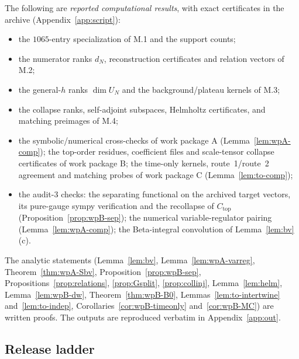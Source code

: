 \documentclass{article}
\theoremstyle{remark}
\begin{document}
The following are \emph{reported computational results}, with exact certificates in the archive (Appendix~\ref{app:script}):
\begin{itemize}
\item the $1065$-entry specialization of M.1 and the support counts;
\item the numerator ranks $d_N$, reconstruction certificates and relation vectors of M.2;
\item the general-$h$ ranks $\dim U_N$ and the background/plateau kernels of M.3;
\item the collapse ranks, self-adjoint subspaces, Helmholtz certificates, and matching preimages of M.4;
\item the symbolic/numerical cross-checks of work package A (Lemma~\ref{lem:wpA-comp}); the top-order residues, coefficient files and scale-tensor collapse certificates of work package B; the time-only kernels, route~1/route~2 agreement and matching probes of work package C (Lemma~\ref{lem:to-comp});
\item the audit-3 checks: the separating functional on the archived target vectors, its pure-gauge sympy verification and the recollapse of $C_{\mathrm{top}}$ (Proposition~\ref{prop:wpB-sep}); the numerical variable-regulator pairing (Lemma~\ref{lem:wpA-comp}); the Beta-integral convolution of Lemma~\ref{lem:bv}(c).
\end{itemize}
The analytic statements (Lemma~\ref{lem:bv}, Lemma~\ref{lem:wpA-varreg}, Theorem~\ref{thm:wpA-Sbv}, Proposition~\ref{prop:wpB-sep}, Propositions~\ref{prop:relations}, \ref{prop:Gsplit}, \ref{prop:collinj}, Lemma~\ref{lem:helm}, Lemma~\ref{lem:wpB-dw}, Theorem~\ref{thm:wpB-B0}, Lemmas~\ref{lem:to-intertwine} and~\ref{lem:to-indep}, Corollaries~\ref{cor:wpB-timeonly} and~\ref{cor:wpB-MC}) are written proofs.
The outputs are reproduced verbatim in Appendix~\ref{app:out}.

\subsection{Release ladder}
\label{sec:ladder}
\end{document}
